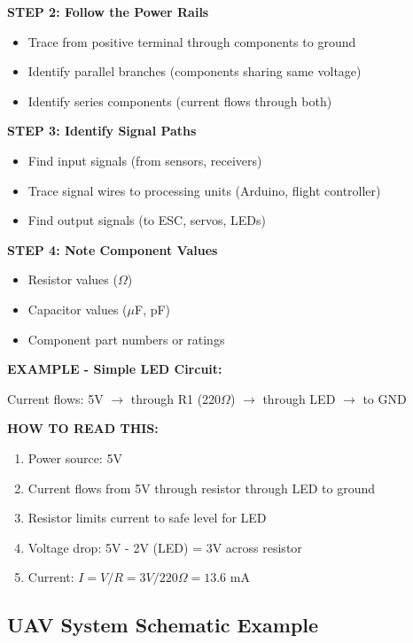 \documentclass[11pt,letterpaper]{article}
\begin{document}
\textbf{STEP 2: Follow the Power Rails}
\begin{itemize}
\item Trace from positive terminal through components to ground
\item Identify parallel branches (components sharing same voltage)
\item Identify series components (current flows through both)
\end{itemize}

\textbf{STEP 3: Identify Signal Paths}
\begin{itemize}
\item Find input signals (from sensors, receivers)
\item Trace signal wires to processing units (Arduino, flight controller)
\item Find output signals (to ESC, servos, LEDs)
\end{itemize}

\textbf{STEP 4: Note Component Values}
\begin{itemize}
\item Resistor values ($\Omega$)
\item Capacitor values ($\mu$F, pF)
\item Component part numbers or ratings
\end{itemize}

\begin{examplebox}
\textbf{EXAMPLE - Simple LED Circuit:}

Current flows: 5V $\rightarrow$ through R1 (220$\Omega$) $\rightarrow$ through LED $\rightarrow$ to GND

\textbf{HOW TO READ THIS:}
\begin{enumerate}[nosep]
\item Power source: 5V
\item Current flows from 5V through resistor through LED to ground
\item Resistor limits current to safe level for LED
\item Voltage drop: 5V - 2V (LED) = 3V across resistor
\item Current: $I = V/R = 3V / 220\Omega = 13.6$ mA
\end{enumerate}
\end{examplebox}

\subsection{UAV System Schematic Example}
\end{document}
